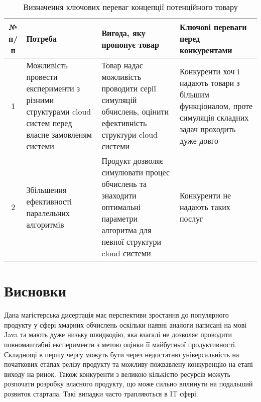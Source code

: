\begin{table}[H]
	\centering
	\begin{tabular}{|c|p{4cm}|p{4cm}|p{4cm}|} \hline
		№ п/п
		& Потреба
		& Вигода, яку пропонує товар
		& Ключові переваги перед конкурентами 
		\\ \hline
		
		1
		& Можливість провести експерименти з різними структурами cloud систем перед власне замовленям системи 
		& Товар надає можливість проводити серії симуляцій обчислень, оцінити ефективність структури cloud системи
		& Конкуренти хоч і надають товари з більшим функціоналом, проте симуляція складних задач проходить дуже довго
		\\ \hline
		
		2
		& Збільшення ефективності паралельних алгоритмів
		& Продукт дозволяє симулювати процес обчислень та знаходити оптимальні параметри алгоритма для певної структури cloud системи
		& Конкуренти не надають таких послуг
		\\ \hline
	\end{tabular}
	\caption{Визначення ключових переваг концепції потенційного товару}
\end{table}



\section{Висновки}
Дана магістерська дисертація має перспективи зростання до популярного продукту у сфері хмарних обчислень оскільки наявні аналоги написані на мові Java та мають дуже низьку швидкодію, яка взагалі не дозволяє проводити повномаштабні експерименти з метою оцінки її майбутньої продуктивності. Складнощі в першу чергу можуть бути через недостатню універсальність на початкових етапах релізу продукту та можливу пожвавлену конкуренцію на етапі виходу на ринок. Також конкуренти з великою кількістю ресурсів можуть розпочати розробку власного продукту, що може сильно вплинути на подальший розвиток стартапа. Такі випадки часто трапляються в IT сфері.
\hspace{10pt}

